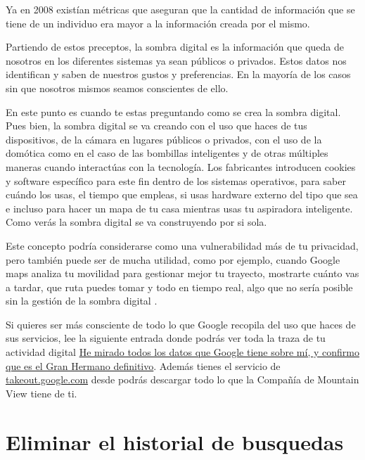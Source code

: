 \documentclass[
  a4paper,
  openany]{book}
\begin{document}
Ya en 2008 existían métricas que aseguran que la cantidad de información que se tiene de un individuo era mayor a la información creada por el mismo.

Partiendo de estos preceptos, la sombra digital es la información que queda de nosotros en los diferentes sistemas ya sean públicos o privados. Estos datos nos identifican y saben de nuestros gustos y preferencias. En la mayoría de los casos sin que nosotros mismos seamos conscientes de ello.

En este punto es cuando te estas preguntando como se crea la sombra digital. Pues bien, la sombra digital se va creando con el uso que haces de tus dispositivos, de la cámara en lugares públicos o privados, con el uso de la domótica como en el caso de las bombillas inteligentes y de otras múltiples maneras cuando interactúas con la tecnología. Los fabricantes introducen cookies y software específico para este fin dentro de los sistemas operativos, para saber cuándo los usas, el tiempo que empleas, si usas hardware externo del tipo que sea e incluso para hacer un mapa de tu casa mientras usas tu aspiradora inteligente. Como verás la sombra digital se va construyendo por si sola.

Este concepto podría considerarse como una vulnerabilidad más de tu privacidad, pero también puede ser de mucha utilidad, como por ejemplo, cuando Google maps analiza tu movilidad para gestionar mejor tu trayecto, mostrarte cuánto vas a tardar, que ruta puedes tomar y todo en tiempo real, algo que no sería posible sin la gestión de la sombra digital \citep{XATAKA-sombra-digital}.

Si quieres ser más consciente de todo lo que Google recopila del uso que haces de sus servicios, lee la siguiente entrada donde podrás ver toda la traza de tu actividad digital \href{https://www.xataka.com/privacidad/he-mirado-todos-datos-que-google-tiene-mi-confirmo-que-gran-hermano-definitivo-2}{He mirado todos los datos que Google tiene sobre mí, y confirmo que es el Gran Hermano definitivo}. Además tienes el servicio de \href{https://takeout.google.com}{takeout.google.com} desde podrás descargar todo lo que la Compañía de Mountain View tiene de ti.

\hypertarget{eliminar-el-historial-de-busquedas}{%
\section{Eliminar el historial de busquedas}\label{eliminar-el-historial-de-busquedas}}
\end{document}
